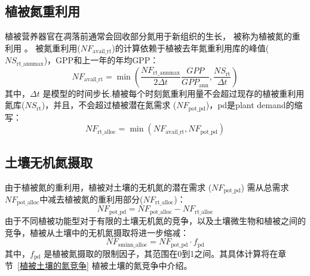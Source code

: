\subsection{植被氮重利用}\label{植被氮重利用}
植被营养器官在凋落前通常会回收部分氮用于新组织的生长，
被称为植被氮的重利用 \citep{magill1997biogeochemical,oikawa2005dynamics,son1991aboveground}。
被氮重利用($NF_{\mathrm{avail\_rt}}$)的计算依赖于植被去年氮重利用库的峰值($NS_{\mathrm{rt\_{annmax}}}$)，GPP和上一年的年均GPP：
\begin{equation}
  NF_{\mathrm{avail\_rt}}=\min{\left(\frac{NF_{\mathrm{rt\_{annmax}}}}{2\Delta t} \frac{GPP}{GPP_{\mathrm{ann}}}, \frac{NS_{\mathrm{rt}}}{{\Delta t}}\right)}
\end{equation}
其中，${\Delta t}$ 是模型的时间步长.植被每个时刻氮重利用量不会超过现存的植被重利用氮库($NS_{\mathrm{rt}}$)，并且，不会超过植被潜在氮需求 ($NF_{\mathrm{pot\_{pd}}}$)，pd是plant demand的缩写：
\begin{equation}\label{NF_rt_alloc}
  NF_{\mathrm{rt\_alloc}}=\min{\left(NF_{\mathrm{avail\_{rt}}}, NF_{\mathrm{pot\_{pd}}}\right)}
\end{equation}


\subsection{土壤无机氮摄取}\label{土壤无机氮摄取}
由于植被氮的重利用，植被对土壤的无机氮的潜在需求 ($NF_{\mathrm{pot\_{pd}}}$) 需从总需求$NF_{\mathrm{pot\_{alloc}}}$中减去植被氮的重利用部分($NF_{\mathrm{rt\_{alloc}}}$)：
\begin{equation}\label{NF_plant_demand_soil}
  NF_{\mathrm{pot\_{pd}}} = NF_{\mathrm{pot\_{alloc}}} - NF_{\mathrm{rt\_alloc}}
\end{equation}
由于不同植被功能型对于有限的土壤无机氮的竞争，以及土壤微生物和植被之间的竞争，植被从土壤中的无机氮摄取将进一步缩减：
\begin{equation}\label{NF_sminn_alloc}
  NF_{\mathrm{sminn\_alloc}} = NF_{\mathrm{pot\_{pd}}}\cdot f_{\mathrm{pd}}
\end{equation}
其中，$f_{\mathrm{pd}}$ 是植被氮摄取的限制因子，其范围在0到1之间。其具体计算将在章节~\ref{植被土壤的氮竞争} 植被土壤的氮竞争中介绍。



